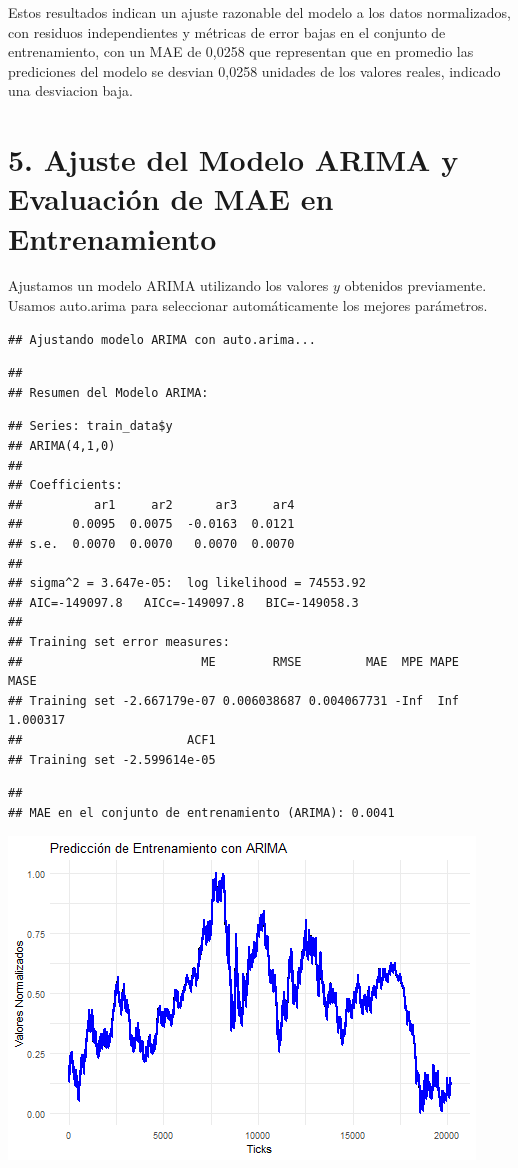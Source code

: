 \documentclass[
]{book}
\begin{document}
Estos resultados indican un ajuste razonable del modelo a los datos normalizados, con residuos independientes y métricas de error bajas en el conjunto de entrenamiento, con un MAE de 0,0258 que representan que en promedio las prediciones del modelo se desvian 0,0258 unidades de los valores reales, indicado una desviacion baja.

\section{5. Ajuste del Modelo ARIMA y Evaluación de MAE en Entrenamiento}\label{ajuste-del-modelo-arima-y-evaluaciuxf3n-de-mae-en-entrenamiento}

Ajustamos un modelo ARIMA utilizando los valores \(y\) obtenidos previamente. Usamos auto.arima para seleccionar automáticamente los mejores parámetros.

\begin{verbatim}
## Ajustando modelo ARIMA con auto.arima...
\end{verbatim}

\begin{verbatim}
## 
## Resumen del Modelo ARIMA:
\end{verbatim}

\begin{verbatim}
## Series: train_data$y 
## ARIMA(4,1,0) 
## 
## Coefficients:
##          ar1     ar2      ar3     ar4
##       0.0095  0.0075  -0.0163  0.0121
## s.e.  0.0070  0.0070   0.0070  0.0070
## 
## sigma^2 = 3.647e-05:  log likelihood = 74553.92
## AIC=-149097.8   AICc=-149097.8   BIC=-149058.3
## 
## Training set error measures:
##                         ME        RMSE         MAE  MPE MAPE     MASE
## Training set -2.667179e-07 0.006038687 0.004067731 -Inf  Inf 1.000317
##                       ACF1
## Training set -2.599614e-05
\end{verbatim}

\begin{verbatim}
## 
## MAE en el conjunto de entrenamiento (ARIMA): 0.0041
\end{verbatim}

\includegraphics{bookdown_time_series_files/figure-latex/unnamed-chunk-15-1.png}
\end{document}
